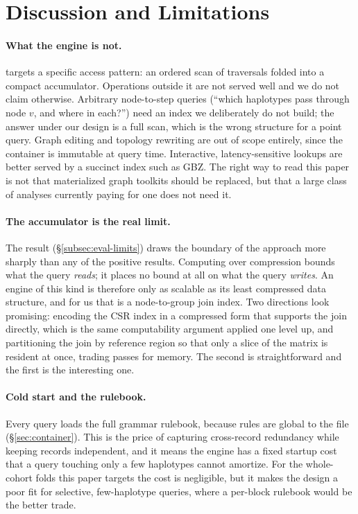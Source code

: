 \section{Discussion and Limitations}
\label{sec:discussion}

\paragraph{What the engine is not.}
\sys targets a specific access pattern: an ordered scan of traversals folded into
a compact accumulator. Operations outside it are not served well and we do not
claim otherwise. Arbitrary node-to-step queries (``which haplotypes pass through
node $v$, and where in each?'') need an index we deliberately do not build; the
answer under our design is a full scan, which is the wrong structure for a point
query. Graph editing and topology rewriting are out of scope entirely, since the
container is immutable at query time. Interactive, latency-sensitive lookups are
better served by a succinct index such as GBZ. The right way to read this paper is
not that materialized graph toolkits should be replaced, but that a large class of
analyses currently paying for one does not need it.

\paragraph{The accumulator is the real limit.}
The  result (\S\ref{subsec:eval-limits}) draws the boundary of the
approach more sharply than any of the positive results. Computing over compression
bounds what the query \emph{reads}; it places no bound at all on what the query
\emph{writes}. An engine of this kind is therefore only as scalable as its least
compressed data structure, and for us that is a node-to-group join index. Two
directions look promising: encoding the CSR index in a compressed form that
supports the join directly, which is the same computability argument applied one
level up, and partitioning the join by reference region so that only a slice of the
matrix is resident at once, trading passes for memory. The second is
straightforward and the first is the interesting one.

\paragraph{Cold start and the rulebook.}
Every query loads the full grammar rulebook, because rules are global to the file
(\S\ref{sec:container}). This is the price of capturing cross-record redundancy
while keeping records independent, and it means the engine has a fixed startup
cost that a query touching only a few haplotypes cannot amortize. For the
whole-cohort folds this paper targets the cost is negligible, but it makes the
design a poor fit for selective, few-haplotype queries, where a per-block rulebook
would be the better trade.

